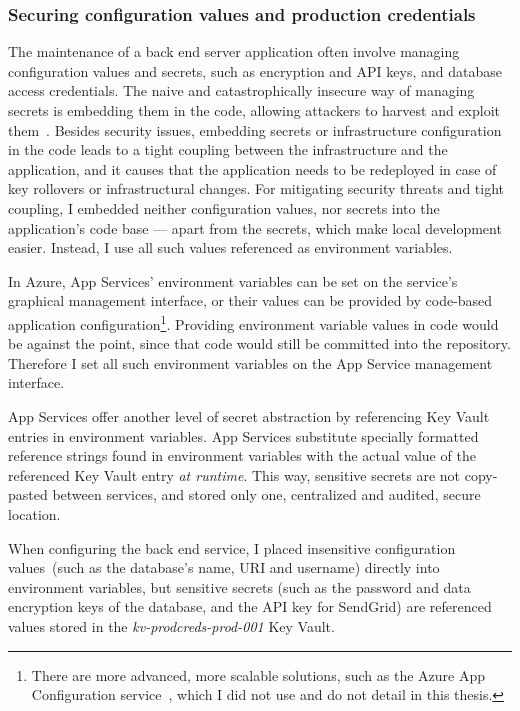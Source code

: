 \subsubsection{Securing configuration values and production credentials}

The maintenance of a back end server application often involve managing configuration values and secrets, such as encryption and API keys, and database access credentials. The naive and catastrophically insecure way of managing secrets is embedding them in the code, allowing attackers to harvest and exploit them~\cite{secretsinsourcecodes, meli2019bad}. Besides security issues, embedding secrets or infrastructure configuration in the code leads to a tight coupling between the infrastructure and the application, and it causes that the application needs to be redeployed in case of key rollovers or infrastructural changes. For mitigating security threats and tight coupling, I embedded neither configuration values, nor secrets into the application's code base — apart from the  secrets, which make local development easier. Instead, I use all such values referenced as environment variables.

In Azure, App Services' environment variables can be set on the service's graphical management interface, or their values can be provided by code-based application configuration\footnote{There are more advanced, more scalable solutions, such as the Azure App Configuration service~\cite{azure-app-config}, which I did not use and do not detail in this thesis.}. Providing environment variable values in code would be against the point, since that code would still be committed into the repository. Therefore I set all such environment variables on the App Service management interface.

App Services offer another level of secret abstraction by referencing Key Vault entries in environment variables. App Services substitute specially formatted reference strings found in environment variables with the actual value of the referenced Key Vault entry \emph{at runtime}. This way, sensitive secrets are not copy-pasted between services, and stored only one, centralized and audited, secure location.

When configuring the back end service, I placed insensitive configuration values (such as the database's name, URI and username) directly into environment variables, but sensitive secrets (such as the password and data encryption keys of the database, and the API key for SendGrid) are referenced values stored in the \emph{kv-prodcreds-prod-001} Key Vault.

